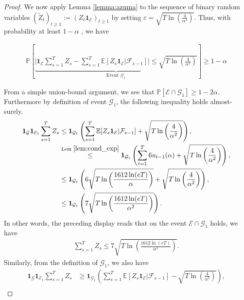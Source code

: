 \begin{proof}
We now apply Lemma \ref{lemma:azuma} to the sequence of binary random variables $(\widetilde{Z}_t)_{t\geq 1} := (Z_t \mathbf{1}_{\mathcal{E}})_{t \geq 1}$ by setting $\varepsilon =  \sqrt{T \ln \left( \frac{4}{\alpha^2} \right)}$. Thus, with probability at least $1-\alpha$ %
, we have

\begin{align*}
  \mathbb{P} \left[ \underbrace{ \bigg| \mathbf{1}_{\mathcal{E}} \sum_{s=1}^TZ_s - \sum_{s=1}^T \mathbb{E}[Z_s \mathbf{1}_{\mathcal{E}} \vert \mathcal{F}_{s-1}] \bigg| \leq   \sqrt{T \ln \left( \frac{4}{\alpha^2} \right)}}_{\text{Event } \mathcal{G}_1} \right] \geq 1- \alpha
  \end{align*}
  
From a simple union-bound argument, we see that $\mathbb{P}[\mathcal{E} \cap \mathcal{G}_1] \geq 1 - 2\alpha$. Furthermore by definition of event $\mathcal{G}_1$,  the following inequality holds almost-surely. 
\begin{align*}
    \mathbf{1}_{\mathcal{G}}\mathbf{1}_{\mathcal{E}_1} \sum_{s=1}^TZ_s &\leq \mathbf{1}_{\mathcal{G}_1}\left(\sum_{s=1}^T \mathbb{E}[Z_s \mathbf{1}_{\mathcal{E}} \vert \mathcal{F}_{s-1}] +  \sqrt{T \ln \left( \frac{4}{\alpha^2} \right)}\right),\\
        &\stackrel{\text{Lem } \ref{lem:cond_exp}}{\leq}  \mathbf{1}_{\mathcal{G}_1}\left( \sum_{t=1}^T 6u_{t-1}(\alpha) + \sqrt{T \ln \left( \frac{4}{\alpha^2} \right)}\right), \\
    &\stackrel{}{\leq}  \mathbf{1}_{\mathcal{G}_1}\left(6\sqrt{T \ln \left( \frac{1612 \ln(eT)}{\alpha} \right)} + \sqrt{T \ln \left( \frac{4}{\alpha^2} \right)}\right), \\
   &\leq  \mathbf{1}_{\mathcal{G}_1}\left(7\sqrt{T \ln \left( \frac{1612 \ln(eT)}{\alpha^2} \right)}\right).
\end{align*}
In other words, the preceding display reads that on the event $\mathcal{E} \cap \mathcal{G}_1$ holds, we have
  \begin{align*}
   \sum_{s=1}^TZ_s \leq 7\sqrt{T \ln \left( \frac{1612 \ln(eT)}{\alpha^2} \right)}.
\end{align*}
Similarly, from the definition of $\mathcal{G}_1$, we also have 
\begin{align*}
     \mathbf{1}_{\mathcal{G}}\mathbf{1}_{\mathcal{E}_1} \sum_{s=1}^TZ_s &\geq \mathbf{1}_{\mathcal{G}_1}\left(\sum_{s=1}^T \mathbb{E}[Z_s \mathbf{1}_{\mathcal{E}} \vert \mathcal{F}_{s-1}] -  \sqrt{T \ln \left( \frac{4}{\alpha^2} \right)}\right),\\

\end{align*}
\end{proof}

